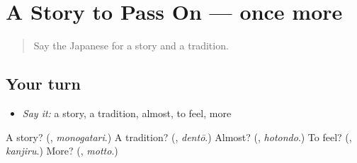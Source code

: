 \section[(dialogue)]{A Story to Pass On — once more}

\label{lesson:JA-R316-review-final-316}



\begin{quote}
Say the Japanese for a story and a tradition.
\end{quote}

\subsection*{Your turn}
\begin{itemize}
\raggedright
  \item \emph{Say it:} a story, a tradition, almost, to feel, more
\end{itemize}

\begin{tcolorbox}[breakable,colback=teal!4,colframe=teal!35!black,title={Before you move on}]
A story? (\textbf{}, \emph{monogatari}.) A tradition? (\textbf{}, \emph{dentō}.) Almost? (\textbf{}, \emph{hotondo}.) To feel? (\textbf{}, \emph{kanjiru}.) More? (\textbf{}, \emph{motto}.)
\end{tcolorbox}

